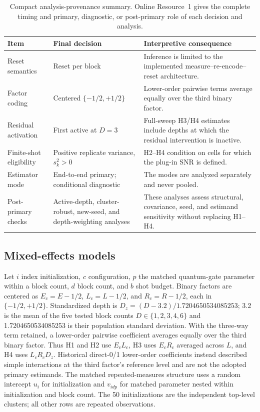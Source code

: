 \documentclass[pdflatex,sn-basic,Numbered]{sn-jnl}
\begin{document}
\begin{table}[t]
\centering
\small
\begin{tabularx}{\textwidth}{@{}p{}p{}>{\raggedright\arraybackslash}X@{}}
\toprule
Item & Final decision & Interpretive consequence \\
\midrule
Reset semantics & Reset per block & Inference is limited to the implemented measure--re-encode--reset architecture. \\
Factor coding & Centered $\{-1/2,+1/2\}$ & Lower-order pairwise terms average equally over the third binary factor. \\
Residual activation & First active at $D=3$ & Full-sweep H3/H4 estimates include depths at which the residual intervention is inactive. \\
Finite-shot eligibility & Positive replicate variance, $s_k^2>0$ & H2--H4 condition on cells for which the plug-in SNR is defined. \\
Estimator mode & End-to-end primary; conditional diagnostic & The modes are analyzed separately and never pooled. \\
Post-primary checks & Active-depth, cluster-robust, new-seed, and depth-weighting analyses & These analyses assess structural, covariance, seed, and estimand sensitivity without replacing H1--H4. \\
\bottomrule
\end{tabularx}
\caption{Compact analysis-provenance summary. Online Resource~1 gives the complete timing and primary, diagnostic, or post-primary role of each decision and analysis.}
\label{tab:analysis-provenance}
\end{table}

\subsection{Mixed-effects models}

Let $i$ index initialization, $c$ configuration, $p$ the matched quantum-gate parameter within a block count, $d$ block count, and $b$ shot budget. Binary factors are centered as $E_c=E-1/2$, $L_c=L-1/2$, and $R_c=R-1/2$, each in $\{-1/2,+1/2\}$. Standardized depth is $D_z=(D-3.2)/1.7204650534085253$; 3.2 is the mean of the five tested block counts $D\in\{1,2,3,4,6\}$ and 1.7204650534085253 is their population standard deviation. With the three-way term retained, a lower-order pairwise coefficient averages equally over the third binary factor. Thus H1 and H2 use $E_cL_c$, H3 uses $E_cR_c$ averaged across $L$, and H4 uses $L_cR_cD_z$. Historical direct-0/1 lower-order coefficients instead described simple interactions at the third factor's reference level and are not the adopted primary estimands. The matched repeated-measures structure uses a random intercept $u_i$ for initialization and $v_{idp}$ for matched parameter nested within initialization and block count. The 50 initializations are the independent top-level clusters; all other rows are repeated observations.
\end{document}
